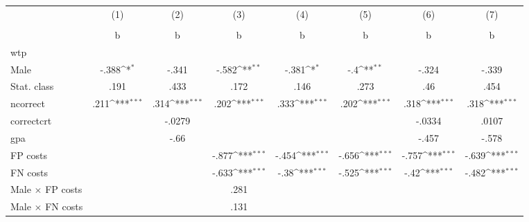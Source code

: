 {
\def\sym#1{\ifmmode^{#1}\else\(^{#1}\)\fi}
\begin{tabular}{l*{7}{c}}
\hline\hline
                &\multicolumn{1}{c}{(1)}&\multicolumn{1}{c}{(2)}&\multicolumn{1}{c}{(3)}&\multicolumn{1}{c}{(4)}&\multicolumn{1}{c}{(5)}&\multicolumn{1}{c}{(6)}&\multicolumn{1}{c}{(7)}\\
                &\multicolumn{1}{c}{}&\multicolumn{1}{c}{}&\multicolumn{1}{c}{}&\multicolumn{1}{c}{}&\multicolumn{1}{c}{}&\multicolumn{1}{c}{}&\multicolumn{1}{c}{}\\
                &        b         &        b         &        b         &        b         &        b         &        b         &        b         \\
\hline
wtp             &                  &                  &                  &                  &                  &                  &                  \\
Male            &    -.388\sym{*}  &    -.341         &    -.582\sym{**} &    -.381\sym{*}  &      -.4\sym{**} &    -.324         &    -.339         \\
Stat. class     &     .191         &     .433         &     .172         &     .146         &     .273         &      .46         &     .454         \\
ncorrect        &     .211\sym{***}&     .314\sym{***}&     .202\sym{***}&     .333\sym{***}&     .202\sym{***}&     .318\sym{***}&     .318\sym{***}\\
correctcrt      &                  &   -.0279         &                  &                  &                  &   -.0334         &    .0107         \\
gpa             &                  &     -.66         &                  &                  &                  &    -.457         &    -.578         \\
FP costs        &                  &                  &    -.877\sym{***}&    -.454\sym{***}&    -.656\sym{***}&    -.757\sym{***}&    -.639\sym{***}\\
FN costs        &                  &                  &    -.633\sym{***}&     -.38\sym{***}&    -.525\sym{***}&     -.42\sym{***}&    -.482\sym{***}\\
Male $\times$ FP costs&                  &                  &     .281         &                  &                  &                  &                  \\
Male $\times$ FN costs&                  &                  &     .131         &                  &                  &                  &                  \\

\end{tabular}}
